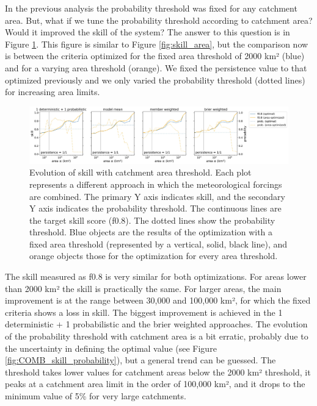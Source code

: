 \documentclass[preprint,12pt]{elsarticle}
\begin{document}
In the previous analysis the probability threshold was fixed for any catchment area. But, what if we tune the probability threshold according to catchment area? Would it improved the skill of the system? The answer to this question is in Figure \ref{fig:skill_area_probability}. This figure is similar to Figure \ref{fig:skill_area}, but the comparison now is between the criteria optimized for the fixed area threshold of 2000 km² (blue) and for a varying area threshold (orange). We fixed the persistence value to that optimized previously and we only varied the probability threshold (dotted lines) for increasing area limits.

\begin{figure}
    \centering
    \includegraphics[width=1\textwidth]{figures/skill_vs_area_varying_probability_2000km2_1239points_060h.jpg}
    \caption{Evolution of skill with catchment area threshold. Each plot represents a different approach in which the meteorological forcings are combined. The primary Y axis indicates skill, and the secondary Y axis indicates the probability threshold. The continuous lines are the target skill score (f0.8). The dotted lines show the probability threshold. Blue objects are the results of the optimization with a fixed area threshold (represented by a vertical, solid, black line), and orange objects those for the optimization for every area threshold.}
    \label{fig:skill_area_probability}
\end{figure}

The skill measured as f0.8 is very similar for both optimizations. For areas lower than 2000 km² the skill is practically the same. For larger areas, the main improvement is at the range between 30,000 and 100,000 km², for which the fixed criteria shows a loss in skill. The biggest improvement is achieved in the 1 deterministic + 1 probabilistic and the  brier weighted approaches. The evolution of the probability threshold with catchment area is a bit erratic, probably due to the uncertainty in defining the optimal value (see Figure \ref{fig:COMB_skill_probability}), but a general trend can be guessed. The threshold takes lower values for catchment areas below the 2000 km² threshold, it peaks at a catchment area limit in the order of 100,000 km², and it drops to the minimum value of 5\% for very large catchments.
\end{document}

